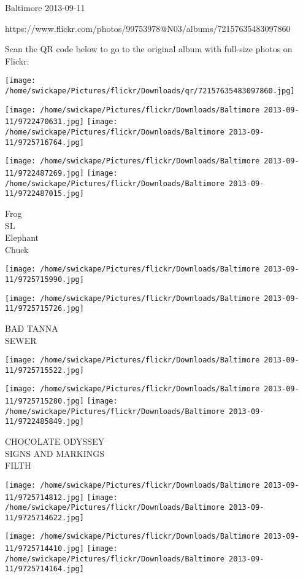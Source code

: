 \documentclass[10pt,letterpaper]{article}
\begin{document}
Baltimore 2013-09-11

https://www.flickr.com/photos/99753978@N03/albums/72157635483097860

Scan the QR code below to go to the original album with full-size photos on Flickr:

\texttt{[image: /home/swickape/Pictures/flickr/Downloads/qr/72157635483097860.jpg]}
\pagebreak

\texttt{[image: /home/swickape/Pictures/flickr/Downloads/Baltimore 2013-09-11/9722470631.jpg]}
\texttt{[image: /home/swickape/Pictures/flickr/Downloads/Baltimore 2013-09-11/9725716764.jpg]}

\texttt{[image: /home/swickape/Pictures/flickr/Downloads/Baltimore 2013-09-11/9722487269.jpg]}
\texttt{[image: /home/swickape/Pictures/flickr/Downloads/Baltimore 2013-09-11/9722487015.jpg]}

Frog\\
SL\\
Elephant\\
Chuck
\pagebreak

\texttt{[image: /home/swickape/Pictures/flickr/Downloads/Baltimore 2013-09-11/9725715990.jpg]}

\vspace{0.25in}
\texttt{[image: /home/swickape/Pictures/flickr/Downloads/Baltimore 2013-09-11/9725715726.jpg]}

BAD TANNA\\
SEWER
\pagebreak

\texttt{[image: /home/swickape/Pictures/flickr/Downloads/Baltimore 2013-09-11/9725715522.jpg]}

\vspace{0.25in}
\texttt{[image: /home/swickape/Pictures/flickr/Downloads/Baltimore 2013-09-11/9725715280.jpg]}
\texttt{[image: /home/swickape/Pictures/flickr/Downloads/Baltimore 2013-09-11/9722485849.jpg]}

CHOCOLATE ODYSSEY\\
SIGNS AND MARKINGS\\
FILTH
\pagebreak

\texttt{[image: /home/swickape/Pictures/flickr/Downloads/Baltimore 2013-09-11/9725714812.jpg]}
\texttt{[image: /home/swickape/Pictures/flickr/Downloads/Baltimore 2013-09-11/9725714622.jpg]}

\texttt{[image: /home/swickape/Pictures/flickr/Downloads/Baltimore 2013-09-11/9725714410.jpg]}
\texttt{[image: /home/swickape/Pictures/flickr/Downloads/Baltimore 2013-09-11/9725714164.jpg]}
\end{document}
